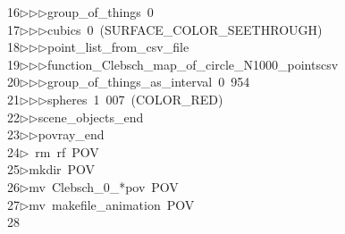 \begin{tabbing}
16\>$\triangleright$\>$\triangleright$\>$\triangleright$\>group\_of\_things\ 0\ \\[0pt]
17\>$\triangleright$\>$\triangleright$\>$\triangleright$\>cubics\ 0\ (SURFACE\_COLOR\_SEETHROUGH)\ \\[0pt]
18\>$\triangleright$\>$\triangleright$\>$\triangleright$\>point\_list\_from\_csv\_file\ \\[0pt]
19\>$\triangleright$\>$\triangleright$\>$\triangleright$\>function\_Clebsch\_map\_of\_circle\_N1000\_pointscsv\ \\[0pt]
20\>$\triangleright$\>$\triangleright$\>$\triangleright$\>group\_of\_things\_as\_interval\ 0\ 954\ \\[0pt]
21\>$\triangleright$\>$\triangleright$\>$\triangleright$\>spheres\ 1\ 007\ (COLOR\_RED)\ \\[0pt]
22\>$\triangleright$\>$\triangleright$\>scene\_objects\_end\ \\[0pt]
23\>$\triangleright$\>$\triangleright$\>povray\_end\\[0pt]
24\>$\triangleright$\>\ rm\ rf\ POV\\[0pt]
25\>$\triangleright$\>mkdir\ POV\\[0pt]
26\>$\triangleright$\>mv\ Clebsch\_0\_*pov\ POV\\[0pt]
27\>$\triangleright$\>mv\ makefile\_animation\ POV\\[0pt]
28\>\end{tabbing}
